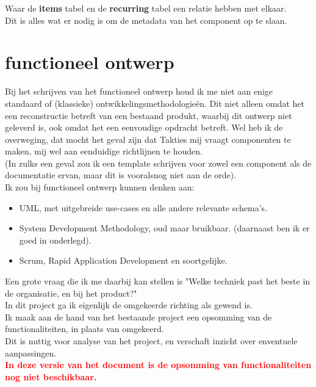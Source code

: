 \documentclass{article}
\begin{document}
Waar de \textbf{items} tabel en de \textbf{recurring} tabel een relatie hebben met elkaar. \\
Dit is alles wat er nodig is om de metadata van het component op te slaan. \\

\newpage
\section{functioneel ontwerp}

Bij het schrijven van het functioneel ontwerp houd ik me niet aan enige standaard of (klassieke) ontwikkelingsmethodologie\"{e}n. Dit niet alleen omdat het een reconstructie betreft van een bestaand produkt, waarbij dit ontwerp niet geleverd is, ook omdat het een eenvoudige opdracht betreft. Wel heb ik de overweging, dat mocht het geval zijn dat Takties mij vraagt componenten te maken, mij wel aan eenduidige richtlijnen te houden. \\
(In zulks een geval zou ik een template schrijven voor zowel een component als de documentatie ervan, maar dit is vooralsnog niet aan de orde). \\

Ik zou bij functioneel ontwerp kunnen denken aan: \\

\begin{itemize}
\item UML, met uitgebreide use-cases en alle andere relevante schema's.
\item System Development Methodology, oud maar bruikbaar. (daarnaast ben ik er goed in onderlegd).
\item Scrum, Rapid Application Development en soortgelijke.
\end{itemize}

Een grote vraag die ik me daarbij kan stellen is "Welke techniek past het beste in de organisatie, en bij het product?" \\

In dit project ga ik eigenlijk de omgekeerde richting als gewend is. \\
Ik maak aan de hand van het bestaande project een opsomming van de functionaliteiten, in plaats van omgekeerd. \\

Dit is nuttig voor analyse van het project, en verschaft inzicht over enventuele aanpassingen. \\


\textcolor{red}{\textbf{In deze versie van het document is de opsomming van functionaliteiten nog niet beschikbaar.}}
	
\end{document}
